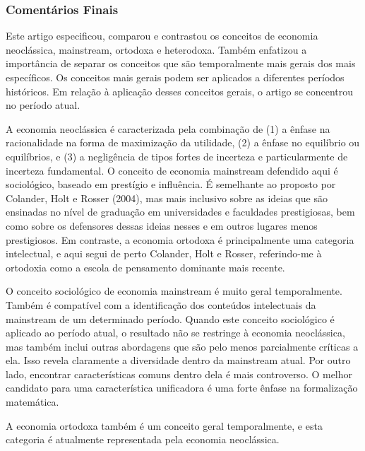 \documentclass[a4paper,12pt]{article}[abntex2]
\begin{document}
\subsubsection{\textbf{Comentários Finais}}

Este artigo especificou, comparou e contrastou os conceitos de economia neoclássica, mainstream, ortodoxa e heterodoxa. Também enfatizou a importância de separar os conceitos que são temporalmente mais gerais dos mais específicos. Os conceitos mais gerais podem ser aplicados a diferentes períodos históricos. Em relação à aplicação desses conceitos gerais, o artigo se concentrou no período atual.

A economia neoclássica é caracterizada pela combinação de (1) a ênfase na racionalidade na forma de maximização da utilidade, (2) a ênfase no equilíbrio ou equilíbrios, e (3) a negligência de tipos fortes de incerteza e particularmente de incerteza fundamental. O conceito de economia mainstream defendido aqui é sociológico, baseado em prestígio e influência. É semelhante ao proposto por Colander, Holt e Rosser (2004), mas mais inclusivo sobre as ideias que são ensinadas no nível de graduação em universidades e faculdades prestigiosas, bem como sobre os defensores dessas ideias nesses e em outros lugares menos prestigiosos. Em contraste, a economia ortodoxa é principalmente uma categoria intelectual, e aqui segui de perto Colander, Holt e Rosser, referindo-me à ortodoxia como a escola de pensamento dominante mais recente.

O conceito sociológico de economia mainstream é muito geral temporalmente. Também é compatível com a identificação dos conteúdos intelectuais da mainstream de um determinado período. Quando este conceito sociológico é aplicado ao período atual, o resultado não se restringe à economia neoclássica, mas também inclui outras abordagens que são pelo menos parcialmente críticas a ela. Isso revela claramente a diversidade dentro da mainstream atual. Por outro lado, encontrar características comuns dentro dela é mais controverso. O melhor candidato para uma característica unificadora é uma forte ênfase na formalização matemática.

A economia ortodoxa também é um conceito geral temporalmente, e esta categoria é atualmente representada pela economia neoclássica.
\end{document}

